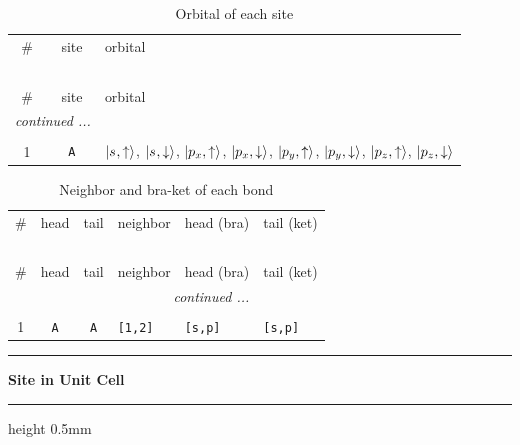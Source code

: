 \documentclass[fleqn,10pt,landscape]{jsarticle}
\begin{document}
\renewcommand{\arraystretch}{1.6}
\begin{longtable}[l]{ccl}
\captionsetup{justification=raggedright, singlelinecheck=off}
\caption{Orbital of each site}
 \\
 \hline \hline
\# & site & orbital \\ \hline \endfirsthead

\multicolumn{2}{l}{\tablename\ \thetable{}} \\
 \hline \hline
\# & site & orbital \\ \hline \endhead

 \hline \hline
\multicolumn{2}{r}{\footnotesize\it continued ...} \\ \endfoot

 \hline \hline
\multicolumn{2}{r}{} \\ \endlastfoot

1 & \texttt{A} & $\ket{s_{},\uparrow}$, $\ket{s_{},\downarrow}$, $\ket{p_{x},\uparrow}$, $\ket{p_{x},\downarrow}$, $\ket{p_{y},\uparrow}$, $\ket{p_{y},\downarrow}$, $\ket{p_{z},\uparrow}$, $\ket{p_{z},\downarrow}$ \\
\end{longtable}
\renewcommand{\arraystretch}{1.6}
\begin{longtable}[l]{ccclll}
\captionsetup{justification=raggedright, singlelinecheck=off}
\caption{Neighbor and bra-ket of each bond}
 \\
 \hline \hline
\# & head & tail & neighbor & head (bra) & tail (ket) \\ \hline \endfirsthead

\multicolumn{5}{l}{\tablename\ \thetable{}} \\
 \hline \hline
\# & head & tail & neighbor & head (bra) & tail (ket) \\ \hline \endhead

 \hline \hline
\multicolumn{5}{r}{\footnotesize\it continued ...} \\ \endfoot

 \hline \hline
\multicolumn{5}{r}{} \\ \endlastfoot

1 & \texttt{A} & \texttt{A} & \texttt{[1,2]} & \texttt{[s,p]} & \texttt{[s,p]} \\
\end{longtable}
\vspace{5mm}
\noindent \rule[0.5mm]{5mm}{0.5mm}\hspace{3mm}\textbf{Site in Unit Cell}\hspace{3mm}\leaders\hrule height 0.5mm\hfill\kern0pt
\vspace{3mm}
\end{document}
